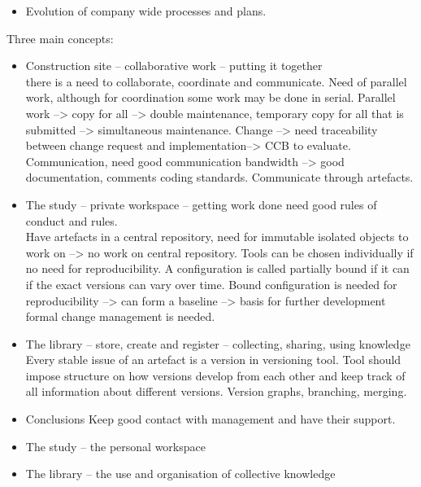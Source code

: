 \begin{itemize}
    \item Evolution of company wide processes and plans.
\end{itemize}
Three main concepts:
\begin{itemize}
    \item Construction site -- collaborative work -- putting it together \\there is a need to collaborate, coordinate and communicate. Need of parallel work, although for coordination some work may be done in serial. Parallel work --> copy for all --> double maintenance, temporary copy for all that is submitted --> simultaneous maintenance. Change --> need traceability between change request and implementation--> CCB to evaluate. Communication, need good communication bandwidth --> good documentation, comments coding standards. Communicate through artefacts.
    \item The study -- private workspace -- getting work done need good rules of conduct and rules. \\
    Have artefacts in a central repository, need for immutable isolated objects to work on --> no work on central repository. Tools can be chosen individually if no need for reproducibility. A configuration is called partially bound if it can if the exact versions can vary over time. Bound configuration is needed for reproducibility --> can form a baseline --> basis for further development formal change management is needed.
    \item The library -- store, create and register -- collecting, sharing, using knowledge  \\
    Every stable issue of an artefact is a version in versioning tool. Tool should impose structure on how versions develop from each other and keep track of all information about different versions. Version graphs, branching, merging.
    \item Conclusions Keep good contact with management and have their support.
    \item The study -- the personal workspace
    \item The library -- the use and organisation of collective knowledge
\end{itemize}

